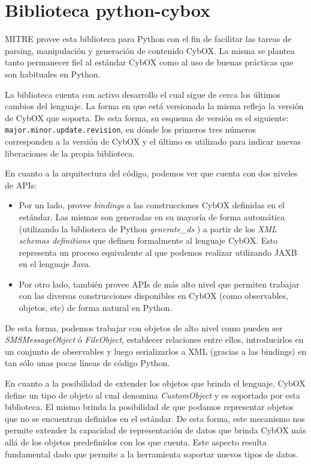 \section{Biblioteca python-cybox}
MITRE provee esta biblioteca \cite{python-cybox-github} para Python con el fin de facilitar las tareas de parsing, manipulación y generación de contenido CybOX. La misma se plantea tanto permanecer fiel al estándar CybOX como al uso de buenas prácticas que son habituales en Python.

La biblioteca cuenta con activo desarrollo el cual sigue de cerca los últimos cambios del lenguaje. La forma en que está versionada la misma refleja la versión de CybOX que soporta. De esta forma, su esquema de versión es el siguiente: \texttt{major.minor.update.revision}, en dónde los primeros tres números corresponden a la versión de CybOX y el último es utilizado para indicar nuevas liberaciones de la propia biblioteca.

En cuanto a la arquitectura del código, podemos ver que cuenta con dos niveles de APIs:

\begin{itemize}
\item Por un lado, provee \emph{bindings} a las construcciones CybOX definidas en el estándar. Las mismas son generadas en su mayoría de forma automática (utilizando la biblioteca de Python \emph{generate\_ds} \cite{generateDS}) a partir de los \emph{XML schemas definitions} que definen formalmente al lenguaje CybOX. Esto representa un proceso equivalente al que podemos realizar utilizando JAXB \cite{JAXB} en el lenguaje Java.
\item Por otro lado, también provee APIs de más alto nivel que permiten trabajar con las diversas construcciones disponibles en CybOX (como observables, objetos, etc) de forma natural en Python.
\end{itemize}

De esta forma, podemos trabajar con objetos de alto nivel como pueden ser \emph{SMSMessageObject} ó \emph{FileObject}, establecer relaciones entre ellos, introducirlos en un conjunto de observables y luego serializarlos a XML (gracias a las bindings) en tan sólo unas pocas líneas de código Python.

En cuanto a la posibilidad de extender los objetos que brinda el lenguaje, CybOX define un tipo de objeto al cual denomina \emph{CustomObject} y es soportado por esta biblioteca. El mismo brinda la posibilidad de que podamos representar objetos que no se encuentran definidos en el estándar. De esta forma, este mecanismo nos permite extender la capacidad de representación de datos que brinda CybOX más allá de los objetos predefinidos con los que cuenta. Este aspecto resulta fundamental dado que permite a la herramienta soportar nuevos tipos de datos.

